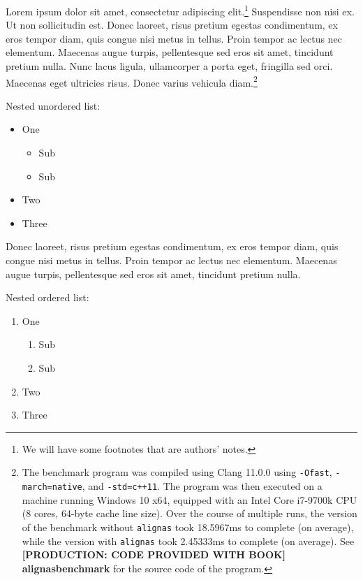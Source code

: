 {Lorem ipsum dolor sit amet, consectetur
adipiscing elit.{\cprotect\footnote{\authorsnote We will have
some footnotes that are authors' notes.}} Suspendisse non nisi ex. Ut non sollicitudin est. Donec
laoreet, risus pretium egestas condimentum, ex eros tempor diam, quis
congue nisi metus in tellus. Proin tempor ac lectus nec elementum.
Maecenas augue turpis, pellentesque sed eros sit amet, tincidunt pretium
nulla. Nunc lacus ligula, ullamcorper a porta eget, fringilla sed orci.
Maecenas eget ultricies risus. Donec varius vehicula diam.{\cprotect\footnote{The benchmark
program was compiled using Clang 11.0.0 using \lstinline!-Ofast!,
\lstinline!-march=native!, and \mbox{\lstinline!-std=c++11!}. The program was then
executed on a machine running Windows 10 x64, equipped with an Intel
Core i7-9700k CPU (8 cores, 64-byte cache line size). Over the
course of multiple runs, the version of the benchmark without
\lstinline!alignas! took 18.5967ms to complete (on average), while the
version with \lstinline!alignas! took 2.45333ms to complete (on average).
  See \textbf{{[PRODUCTION: CODE PROVIDED WITH BOOK] alignasbenchmark}} for the source code of the program.}}
  

Nested unordered list:

\begin{itemize}
\item{One\begin{itemize}
\item{Sub}
\item{Sub}
\end{itemize}
}
\item{Two}
\item{Three}
\end{itemize}

Donec
laoreet, risus pretium egestas condimentum, ex eros tempor diam, quis
congue nisi metus in tellus. Proin tempor ac lectus nec elementum.
Maecenas augue turpis, pellentesque sed eros sit amet, tincidunt pretium
nulla. %

Nested ordered list:

\begin{enumerate}\setlength{\leftmarginii}{6mm}
\item{One\begin{enumerate}
\item{Sub}
\item{Sub}
\end{enumerate}
}
\item{Two}
\item{Three}
\end{enumerate}

}
